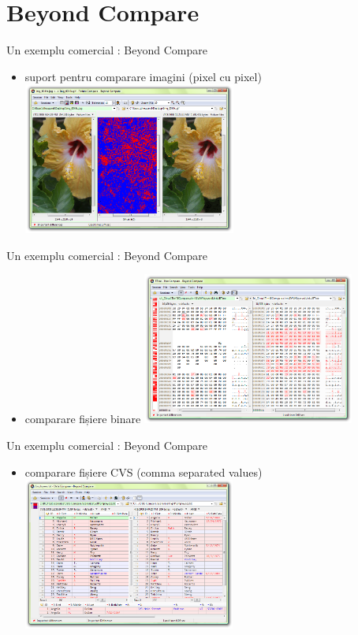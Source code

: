 \documentclass{beamer}
\begin{document}
\section{Beyond Compare}
\frame{\tableofcontents[currentsection]}

\begin{frame}{Un exemplu comercial : Beyond Compare}
  \begin{itemize}
    \item suport pentru comparare imagini (pixel cu pixel)
      \includegraphics[height=5cm]{code/bc-imagini.png}
  \end{itemize}
\end{frame}

\begin{frame}{Un exemplu comercial : Beyond Compare}
  \begin{itemize}      
      \item comparare fișiere binare
      \includegraphics[height=5cm]{code/bc-hex.png}
  \end{itemize}
\end{frame}

\begin{frame}{Un exemplu comercial : Beyond Compare}
  \begin{itemize}      
      \item comparare fișiere CVS (comma separated values)
      \includegraphics[height=5cm]{code/bc-cvs.png}
  \end{itemize}
\end{frame}
\end{document}
